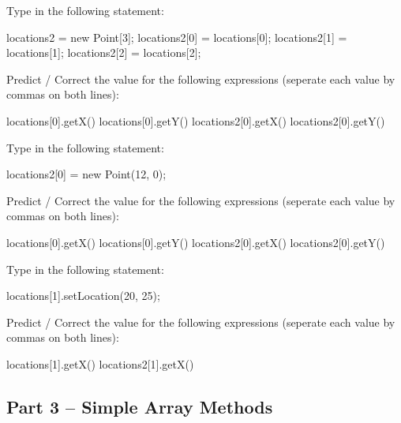 \begin{eval}
\begin{sevalenum}
Type in the following statement:

\begin{code}
locations2 = new Point[3];
locations2[0] = locations[0];
locations2[1] = locations[1];
locations2[2] = locations[2];
\end{code}

Predict / Correct the value for the following expressions (seperate each value by commas on both lines):

\begin{code}
locations[0].getX()
locations[0].getY()
locations2[0].getX()
locations2[0].getY()
\end{code}

\evallinetwo

\item 

Type in the following statement:

\begin{code}
locations2[0] = new Point(12, 0);
\end{code}

Predict / Correct the value for the following expressions (seperate each value by commas on both lines):

\begin{code}
locations[0].getX()
locations[0].getY()
locations2[0].getX()
locations2[0].getY()
\end{code}



\item 

Type in the following statement:

\begin{code}
locations[1].setLocation(20, 25);
\end{code}

Predict / Correct the value for the following expressions (seperate each value by commas on both lines):

\begin{code}
locations[1].getX()
locations2[1].getX()
\end{code}

\evallinetwo


\end{sevalenum}
\end{eval}

\initialbox


\subsection{Part 3 -- Simple Array Methods}

